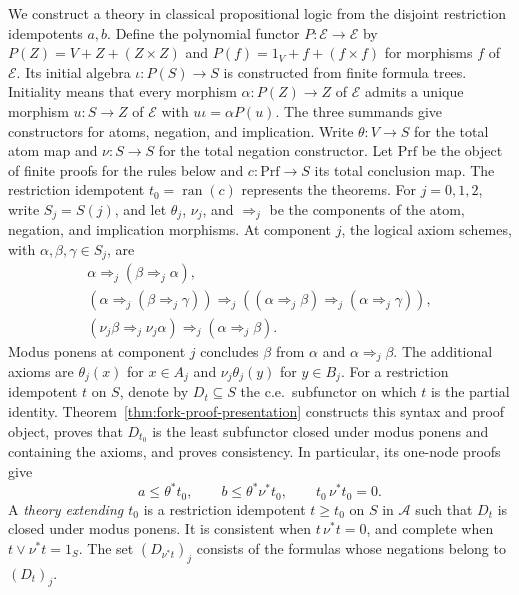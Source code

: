 \documentclass[11pt]{article}
\newcommand{\ran}{\operatorname{ran}}
\begin{document}
We construct a theory in classical propositional logic from the
disjoint restriction idempotents $a,b$. Define the polynomial functor
$P:\mathcal E\to\mathcal E$ by
$P(Z)=V+Z+(Z\times Z)$ and
$P(f)=1_V+f+(f\times f)$ for morphisms $f$ of $\mathcal E$.
Its initial algebra $\iota:P(S)\to S$ is constructed from finite
formula trees. Initiality means that every morphism
$\alpha:P(Z)\to Z$ of $\mathcal E$ admits a unique morphism $u:S\to Z$
of $\mathcal E$
with $u\iota=\alpha P(u)$.
The three summands give constructors for atoms, negation, and implication.
Write $\theta:V\to S$ for the total atom map
and $\nu:S\to S$ for the total negation constructor.
Let $\mathrm{Prf}$ be the object of finite proofs for the rules below
and $c:\mathrm{Prf}\to S$ its total conclusion map.
The restriction idempotent $t_0=\ran(c)$ represents the theorems.
For $j=0,1,2$, write $S_j=S(j)$, and let $\theta_j$, $\nu_j$,
and $\Rightarrow_j$ be the components of the atom, negation,
and implication morphisms. At component $j$, the logical axiom
schemes, with $\alpha,\beta,\gamma\in S_j$, are
\[
\begin{gathered}
 \alpha\Rightarrow_j(\beta\Rightarrow_j\alpha),\\
 (\alpha\Rightarrow_j(\beta\Rightarrow_j\gamma))
   \Rightarrow_j((\alpha\Rightarrow_j\beta)\Rightarrow_j
                         (\alpha\Rightarrow_j\gamma)),\\
 (\nu_j\beta\Rightarrow_j\nu_j\alpha)
       \Rightarrow_j(\alpha\Rightarrow_j\beta).
\end{gathered}
\]
Modus ponens at component $j$ concludes $\beta$ from $\alpha$
and $\alpha\Rightarrow_j\beta$. The additional axioms are
$\theta_j(x)$ for $x\in A_j$ and $\nu_j\theta_j(y)$ for $y\in B_j$.
For a restriction idempotent $t$ on $S$, denote by $D_t\subseteq S$
the c.e.\ subfunctor on which $t$ is the partial identity.
Theorem~\ref{thm:fork-proof-presentation} constructs this syntax and
proof object, proves that $D_{t_0}$ is the least
subfunctor closed under modus ponens and containing the axioms, and proves
consistency. In particular, its one-node proofs give
\begin{equation}\label{eq:atomic-inequalities}
 a\le\theta^*t_0,\qquad
 b\le\theta^*\nu^*t_0,\qquad t_0\,\nu^*t_0=0.
\end{equation}
A \emph{theory extending $t_0$} is a restriction idempotent $t\ge t_0$
on $S$ in $\mathcal A$ such that $D_t$ is closed under modus ponens.
It is consistent when $t\,\nu^*t=0$, and complete when
$t\vee\nu^*t=1_S$. The set $(D_{\nu^*t})_j$ consists of the
formulas whose negations belong to $(D_t)_j$.
\end{document}
